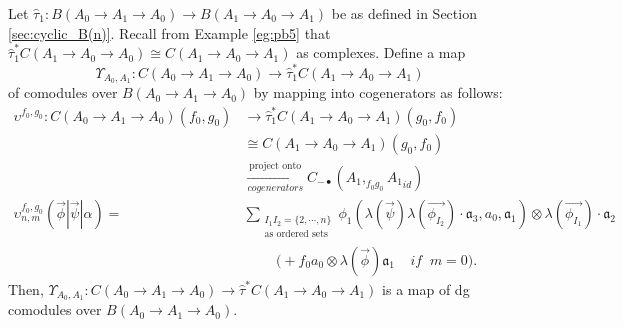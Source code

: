 \begin{prop}
\label{prop:c1}
Let $\hat{\tau}_1: 
B(A_0 \to A_1 \to A_0) 
\longrightarrow B(A_1 \to A_0 \to A_1)$ 
be as defined in Section 
\ref{sec:cyclic_B(n)}.
Recall from Example \ref{eg:pb5} that 
$\hat{\tau}_1^*C(A_1 \to A_0 \to A_0)
\cong C(A_1 \to A_0 \to A_1)$ 
as complexes. Define a map 
$$
\Upsilon_{A_0,A_1}: C(A_0 \to A_1 \to A_0)
\to \hat{\tau}_1^*C(A_1 \to A_0 \to A_1)
$$
of comodules over 
$B(A_0 \to A_1 \to A_0)$ by mapping into 
cogenerators as follows:
\begin{align*}
\upsilon^{f_0, g_0}: C(A_0 \to A_1 \to A_0)(f_0,g_0) 
&\to
\hat{\tau}_1^*C(A_1 \to A_0 \to A_1)(g_0,f_0)\\
&\cong 
C(A_1 \to A_0 \to A_1)(g_0,f_0)\\
&\xrightarrow[cogenerators]{\textrm{project onto}}
C_{-\bullet}(A_1, _{f_0g_0}{A_1}_{id})\\
\upsilon_{n,m}^{f_0,g_0} 
(\vec{\phi} | \vec{\psi} | \alpha) = 
& \sum_{\substack{I_1I_2 = \{2,\cdots,n\} \\
                          \textrm{as ordered sets}}}
  \phi_1(\lambda(\vec{\psi})\lambda(\vec{\phi_{I_2}})\cdot \mathfrak{a}_3, a_0, \mathfrak{a}_1) \otimes \lambda(\vec{\phi_{I_1}}) \cdot \mathfrak{a}_2 \\
&\phantom{{}move{}}
\bigg( + f_0a_0 \otimes \lambda(\vec{\phi}) \mathfrak{a}_1 
  \; \; \; \; if \; \; m = 0 \bigg).
\end{align*}
Then, $\Upsilon_{A_0,A_1}: C(A_0 \to A_1 \to A_0)
\to \hat{\tau}^*C(A_1 \to A_0 \to A_1)$ 
is a map of dg comodules over 
$B(A_0 \to A_1 \to A_0)$.
\end{prop}
%
